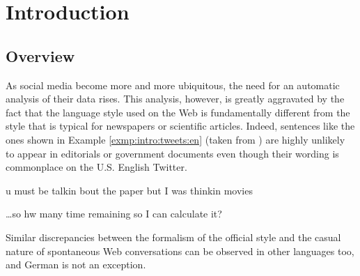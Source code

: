 

\part{Introduction}

\chapter*{Overview}
As social media become more and more ubiquitous, the need for an
automatic analysis of their data rises.  This analysis, however, is
greatly aggravated by the fact that the language style used on the Web
is fundamentally different from the style that is typical for
newspapers or scientific articles.  Indeed, sentences like the ones
shown in Example \ref{exmp:intro:tweets:en} (taken from
\citet{HanBaldwin:11}) are highly unlikely to appear in editorials or
government documents even though their wording is commonplace on the
U.S. English Twitter.
\begin{example}\label{exmp:intro:tweets:en}
u must be talkin bout the paper but I was thinkin movies

\dots so hw many time remaining so I can calculate it?
\end{example}
Similar discrepancies between the formalism of the official style and the
casual nature of spontaneous Web conversations can be observed in other
languages too, and German is not an exception.

